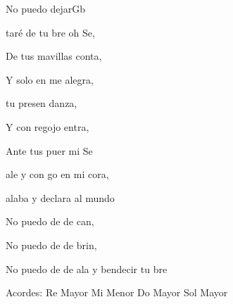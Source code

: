 \documentclass[12pt, spanish]{book}
\begin{document}
\begin{song}{No puedo dejar}{Gb}
        \begin{SBExtraKeys}{
            \clearpage


            \begin{SBOpGroup}
                taré de tu bre oh Se,

                De tus mavillas conta,

                Y solo en  me alegra,


                 tu presen danza,

                Y con regojo entra,

                Ante tus puer mi Se
            \end{SBOpGroup}
            \vskip 20pt
            \begin{SBOpGroup}
                 ale y con go en mi cora,


                 alaba y declara al mundo 
            \end{SBOpGroup}

            \begin{SBChorus}
                No puedo de de can,

                No puedo de de brin,

                No puedo de de ala y bendecir tu bre
            \end{SBChorus}

            \ifChordBk
            \begin{SBOpGroup}
                Acordes:\break
                \upchord{\D}\qquad Re  Mayor  \hfill
                \upchord{\Em}Mi Menor \hfill\null\break
                \upchord{\C}\qquad Do Mayor \hfill
                \upchord{\G}\qquad Sol Mayor \hfill\null\break
            \end{SBOpGroup}
            \fi
        }\end{SBExtraKeys}
    \end{song}
\end{document}
